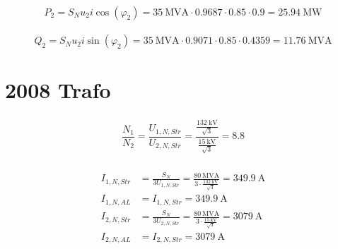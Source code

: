 \documentclass[11pt,a4paper]{scrartcl}
\newcommand{\mybr}[1]{\left(#1\right)}
\newcommand{\0}{_{\mybr{0}}}
\newcommand{\1}{_{\mybr{1}}}
\newcommand{\2}{_{\mybr{2}}}
\newcommand{\UPNS}{U_{1,N,Str}}
\newcommand{\USNS}{U_{2,N,Str}}
\newcommand{\IPNS}{I_{1,N,Str}}
\newcommand{\ISNS}{I_{2,N,Str}}
\newcommand{\IPNA}{I_{1,N,AL}}
\newcommand{\ISNA}{I_{2,N,AL}}
\newcommand{\cz}{\cos\mybr{\varphi_2}}
\newcommand{\sz}{\sin\mybr{\varphi_2}}
\begin{document}
\subsection{}
\begin{equation}
P_2=S_N u_2 i \cz=\SI{35}{\mega\volt\ampere}\cdot\num{0.9687}\cdot\num{0.85}\cdot\num{0.9}=\SI{25.94}{\mega\watt}
\end{equation}

\subsection{}
\begin{equation}
Q_2=S_N u_2 i \sz=\SI{35}{\mega\volt\ampere}\cdot\num{0.9071}\cdot\num{0.85}\cdot\num{0.4359}=\SI{11.76}{\mega\volt\ampere}
\end{equation}

\clearpage
\part{2008 Trafo}
\section{}
\begin{equation}
\frac{N_1}{N_2}=\frac{\UPNS}{\USNS}=\frac{\frac{\SI{132}{\kilo\volt}}{\sqrt{3}}}{\frac{\SI{15}{\kilo\volt}}{\sqrt{3}}}=\num{8.8}
\end{equation}

\section{}
\begin{align}
\IPNS&=\frac{S_N}{3\UPNS}=\frac{\SI{80}{\mega\volt\ampere}}{3\cdot\frac{\SI{132}{\kilo\volt}}{\sqrt{3}}}=\SI{349.9}{\ampere}\\
\IPNA&=\IPNS=\SI{349.9}{\ampere}\\
\ISNS&=\frac{S_N}{3\USNS}=\frac{\SI{80}{\mega\volt\ampere}}{3\cdot\frac{\SI{15}{\kilo\volt}}{\sqrt{3}}}=\SI{3079}{\ampere}\\
\ISNA&=\ISNS=\SI{3079}{\ampere}
\end{align}

\section{}
\end{document}
